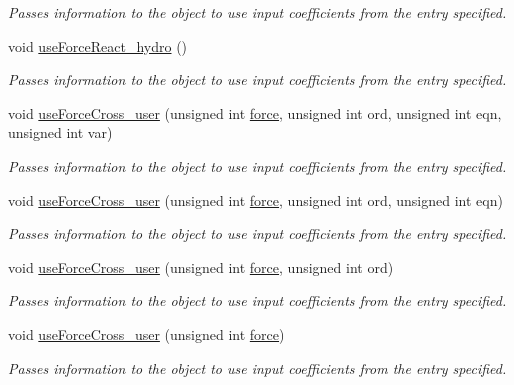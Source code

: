 \begin{DoxyCompactItemize}
\begin{DoxyCompactList}\small\item\em Passes information to the object to use input coefficients from the entry specified. \end{DoxyCompactList}\item 
void \hyperlink{classosea_1_1ofreq_1_1_motion_model_a081dd7c11656da25fafa08f994685e48}{use\-Force\-React\-\_\-hydro} ()
\begin{DoxyCompactList}\small\item\em Passes information to the object to use input coefficients from the entry specified. \end{DoxyCompactList}\item 
void \hyperlink{classosea_1_1ofreq_1_1_motion_model_a1159117995080d2b62e50fceaeb29778}{use\-Force\-Cross\-\_\-user} (unsigned int \hyperlink{input__syntax_8dox_ab0a92c70357da47fe86696522eab7dc8}{force}, unsigned int ord, unsigned int eqn, unsigned int var)
\begin{DoxyCompactList}\small\item\em Passes information to the object to use input coefficients from the entry specified. \end{DoxyCompactList}\item 
void \hyperlink{classosea_1_1ofreq_1_1_motion_model_a3eabe29c2306d9a36445cfb4b27c4b02}{use\-Force\-Cross\-\_\-user} (unsigned int \hyperlink{input__syntax_8dox_ab0a92c70357da47fe86696522eab7dc8}{force}, unsigned int ord, unsigned int eqn)
\begin{DoxyCompactList}\small\item\em Passes information to the object to use input coefficients from the entry specified. \end{DoxyCompactList}\item 
void \hyperlink{classosea_1_1ofreq_1_1_motion_model_ac507056503b23bddf1e5fcf5850b7e8b}{use\-Force\-Cross\-\_\-user} (unsigned int \hyperlink{input__syntax_8dox_ab0a92c70357da47fe86696522eab7dc8}{force}, unsigned int ord)
\begin{DoxyCompactList}\small\item\em Passes information to the object to use input coefficients from the entry specified. \end{DoxyCompactList}\item 
void \hyperlink{classosea_1_1ofreq_1_1_motion_model_af629a294d6f304b0357a514c9cf5dcf9}{use\-Force\-Cross\-\_\-user} (unsigned int \hyperlink{input__syntax_8dox_ab0a92c70357da47fe86696522eab7dc8}{force})
\begin{DoxyCompactList}\small\item\em Passes information to the object to use input coefficients from the entry specified. \end{DoxyCompactList}\item 

\end{DoxyCompactItemize}
